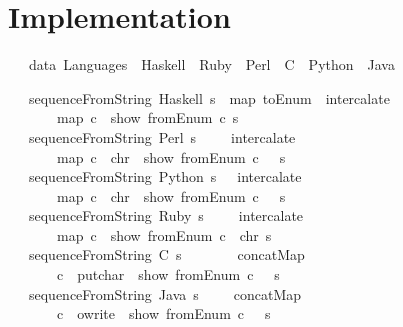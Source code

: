\documentclass[12pt]{article}
\begin{document}
\section{Implementation}
\begin{tabbing}\ttfamily
~~~data~Languages~~Haskell~~Ruby~~Perl~~C~~Python~~Java
\end{tabbing}
\begin{tabbing}\ttfamily
~~~sequenceFromString~Haskell~s~~map~toEnum~~intercalate~~\\
\ttfamily ~~~~~~~map~c~~show~fromEnum~c~s~~\\
\ttfamily ~~~sequenceFromString~Perl~s~~~~~intercalate~~\\
\ttfamily ~~~~~~~map~c~~chr~~show~fromEnum~c~~~s\\
\ttfamily ~~~sequenceFromString~Python~s~~~intercalate~~\\
\ttfamily ~~~~~~~map~c~~chr~~show~fromEnum~c~~~s\\
\ttfamily ~~~sequenceFromString~Ruby~s~~~~~intercalate~~\\
\ttfamily ~~~~~~~map~c~~show~fromEnum~c~~chr~s\\
\ttfamily ~~~sequenceFromString~C~s~~~~~~~~concatMap\\
\ttfamily ~~~~~~~c~~putchar~~show~fromEnum~c~~~s\\
\ttfamily ~~~sequenceFromString~Java~s~~~~~concatMap\\
\ttfamily ~~~~~~~c~~owrite~~show~fromEnum~c~~~s
\end{tabbing}
\end{document}
